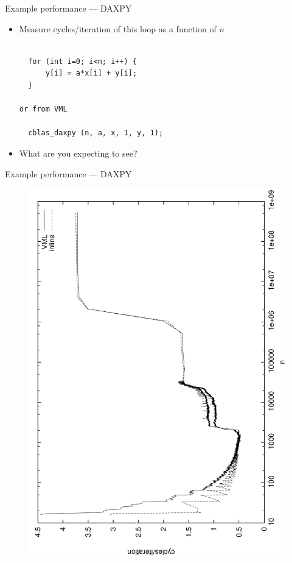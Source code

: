 \begin{frame}[fragile]{Example performance --- DAXPY}

  \begin{itemize}
  \item Measure cycles/iteration of this loop as a function of $n$

\begin{verbatim}

  for (int i=0; i<n; i++) {
      y[i] = a*x[i] + y[i];
  }

or from VML

  cblas_daxpy (n, a, x, 1, y, 1);

\end{verbatim}

  \item What are you expecting to see?
  \end{itemize}
  
\end{frame}

\begin{frame}{Example performance --- DAXPY}

  \begin{figure}
      \includegraphics[width=0.65\linewidth,angle=270]{img/daxpy.pdf}
  \end{figure}

\end{frame}


